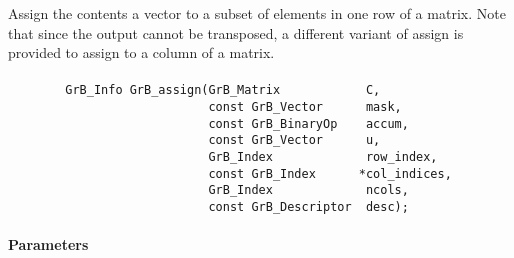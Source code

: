 Assign the contents a vector to a subset of elements in one row of a matrix. 
Note that since the output cannot be transposed, a different variant of
{\sf assign} is provided to assign to a column of a matrix.

\paragraph{\syntax}

\begin{verbatim}
        GrB_Info GrB_assign(GrB_Matrix            C,
                            const GrB_Vector      mask,
                            const GrB_BinaryOp    accum,
                            const GrB_Vector      u,
                            GrB_Index             row_index,
                            const GrB_Index      *col_indices,
                            GrB_Index             ncols,
                            const GrB_Descriptor  desc);
\end{verbatim}

\paragraph{Parameters}

